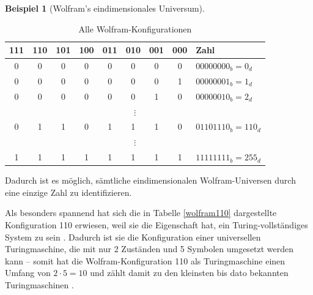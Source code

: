 \documentclass[11pt]{article} %
\theoremstyle{definition}
\newtheorem*{beisp}{Beispiel}
\begin{document}
\begin{beisp}[Wolfram's eindimensionales Universum]
\begin{table}[here]
\begin{center}
\begin{tabular}{|c|c|c|c|c|c|c|c||l|}
\hline
111 & 110 & 101 &100 &011 &010 &001 &000 & Zahl \\\hline\hline
 0 & 0 & 0 & 0& 0 & 0 & 0 & 0 & $00000000_b = 0_d$ \\\hline
 0 & 0 & 0 & 0& 0 & 0 & 0 & 1 & $00000001_b = 1_d$ \\\hline
 0 & 0 & 0 & 0& 0 & 0 & 1 & 0 & $00000010_b = 2_d$ \\\hline
\multicolumn{9}{|c|}{$\vdots$} \\\hline
 0 & 1 & 1 & 0& 1 & 1 & 1 & 0 & $01101110_b = 110_d$ \\\hline
\multicolumn{9}{|c|}{$\vdots$} \\\hline
 1 & 1 & 1 & 1& 1 & 1 & 1 & 1 & $11111111_b = 255_d$ \\\hline
\end{tabular}
\end{center}
\caption{Alle Wolfram-Konfigurationen}
\label{wolframalle}
\end{table}

Dadurch ist es möglich, sämtliche eindimensionalen Wolfram-Universen durch eine einzige Zahl zu identifizieren.

Als besonders spannend hat sich die in Tabelle \ref{wolfram110} dargestellte Konfiguration 110 erwiesen, weil sie die Eigenschaft hat, ein Turing-vollständiges System zu sein \cite{betz2003, wolfram2002}. Dadurch ist sie die Konfiguration einer universellen Turingmaschine, die mit nur 2 Zuständen und 5 Symbolen umgesetzt werden kann -- somit hat die Wolfram-Konfiguration 110 als Turingmaschine einen Umfang von $2\cdot 5 = 10$ und zählt damit zu den kleinsten bis dato bekannten Turingmaschinen \cite{betz2003}.

\end{beisp}
\end{document}
